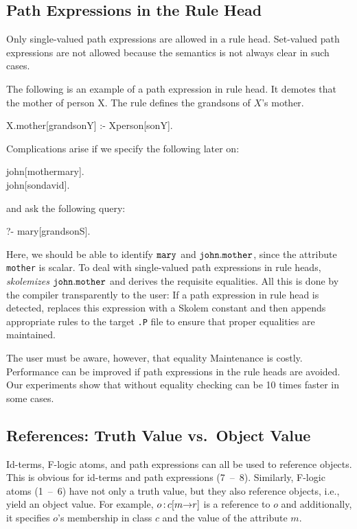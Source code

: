 \documentclass[11pt]{report}
\begin{document}
\subsection{Path Expressions in the Rule Head}

Only single-valued path expressions are allowed in a rule head. Set-valued
path expressions are not allowed because the semantics is not always clear
in such cases.

The following is an example of a path expression in rule head. It demotes
that the mother of person X. The rule defines the grandsons of $X$'s
mother.
\begin{qrules}
X.mother[grandson{\mvd}Y] :- X{\isa}person[son{\mvd}Y].
\end{qrules}
Complications arise if we specify the following later on:
\begin{qrules}
john[mother{\fd}mary]. \\
john[son{\mvd}david].
\end{qrules}
and ask the following query:
\begin{qrules}
?- mary[grandson{\mvd}S].
\end{qrules}

Here, we should be able to identify ${\tt mary}$ and ${\tt john.mother}$,
since the attribute {\tt mother} is scalar. To deal with single-valued path
expressions in rule heads, \FLORA \emph{skolemizes} ${\tt john.mother}$ and
derives the requisite equalities.  All this is done by the
\FLORA compiler transparently to the user: If a path expression in rule head
is detected, \FLORA replaces this expression with a Skolem constant and
then appends appropriate rules to the target {\tt .P} file to ensure that
proper equalities are maintained.

The user must be aware, however, that equality Maintenance is costly.
Performance can be improved if path expressions in the rule heads are
avoided.  Our experiments show that without equality checking \FLORA can be
10 times faster in some cases.


\subsection{References: Truth Value vs.\ Object Value}\label{sec-references}

Id-terms, F-logic atoms, and path expressions can all be used to
reference objects. This is obvious for id-terms and path
expressions (7~--~8). Similarly, F-logic atoms (1~--~6) have not only a
truth value, but they also reference objects, i.e., yield an object value.
For example, $o\,{\bf{:}}\, c[m{\rightarrow} r]$ is a reference to $o$ and additionally,
it specifies $o$'s membership in class $c$ and the value of the attribute $m$.
\end{document}
